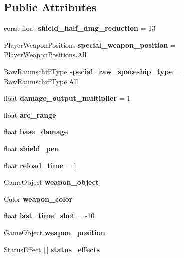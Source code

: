 \subsection*{Public Attributes}
\begin{DoxyCompactItemize}
\item 
\mbox{\label{class_weapon_a5dcd7cc67037c934dac557a95bd3df5e}} 
const float {\bfseries shield\+\_\+half\+\_\+dmg\+\_\+reduction} = 13
\item 
\mbox{\label{class_weapon_a8ff40165275360718664552a765d20cc}} 
Player\+Weapon\+Positions {\bfseries special\+\_\+weapon\+\_\+position} = Player\+Weapon\+Positions.\+All
\item 
\mbox{\label{class_weapon_ab3b4a28805bd1dfc6290c42a62b6daff}} 
Raw\+Raumschiff\+Type {\bfseries special\+\_\+raw\+\_\+spaceship\+\_\+type} = Raw\+Raumschiff\+Type.\+All
\item 
\mbox{\label{class_weapon_a61133e309b5126d35e5a3334023f1cdb}} 
float {\bfseries damage\+\_\+output\+\_\+multiplier} = 1
\item 
\mbox{\label{class_weapon_ac1c1e18f2b60ef06ec8028413d0894a7}} 
float {\bfseries arc\+\_\+range}
\item 
\mbox{\label{class_weapon_aeb5d26e6edcc543e3e4a01b5452ee6ba}} 
float {\bfseries base\+\_\+damage}
\item 
\mbox{\label{class_weapon_a8b11eb278e126bf3f80a7f71b55f5904}} 
float {\bfseries shield\+\_\+pen}
\item 
\mbox{\label{class_weapon_afc855beae6de1af99ac11001e1fe0522}} 
float {\bfseries reload\+\_\+time} = 1
\item 
\mbox{\label{class_weapon_a25932f73a2e0a7b040c100cbe0812678}} 
Game\+Object {\bfseries weapon\+\_\+object}
\item 
\mbox{\label{class_weapon_a5801c0f3277caf61b8e005fa7552f3a2}} 
Color {\bfseries weapon\+\_\+color}
\item 
\mbox{\label{class_weapon_a99a7385f94586c9fb39f33e38ba9ad4e}} 
float {\bfseries last\+\_\+time\+\_\+shot} = -\/10
\item 
\mbox{\label{class_weapon_a57a4230f8fed1bf702eaa2c7ab94f236}} 
Game\+Object {\bfseries weapon\+\_\+position}
\item 
\mbox{\label{class_weapon_a1fb20db3da5e83e012db1d4d45b0cfe5}} 
\hyperlink{class_status_effect}{Status\+Effect} \mbox{[}$\,$\mbox{]} {\bfseries status\+\_\+effects}
\end{DoxyCompactItemize}
